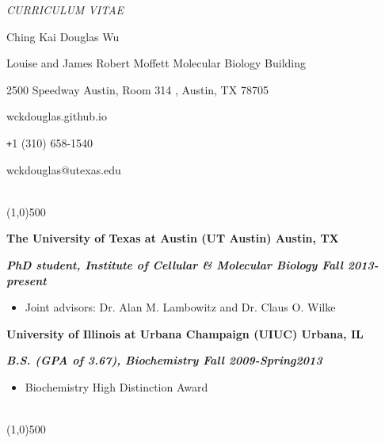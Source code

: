 \documentclass[dvips,11pt]{article}
\begin{document}
\centerline{\it \small CURRICULUM VITAE}
\vspace{2mm}
\centerline{\Large Ching Kai Douglas Wu}  
\centerline{ Louise and James Robert Moffett Molecular Biology Building}
\centerline{2500 Speedway Austin, Room 314 , Austin, TX 78705} 
\centerline{wckdouglas.github.io}
\centerline{\texttt{+}1 (310) 658-1540}
\centerline{wckdouglas@utexas.edu}
\vspace{.5mm}

 \vspace{-2mm}
\\\noindent \line(1,0){500}\\
\noindent \centerline{\bf The University of Texas at Austin (UT Austin) \hfill Austin, TX}
\noindent \centerline{\textit{\textbf{PhD student, Institute of Cellular \& Molecular Biology \hfill Fall 2013-present}}}
\vspace{-6mm}
\begin{spacing}{0.2}
\begin{itemize} \parskip 0pt \parsep 0pt
	\setlength{\itemsep}{0pt}
	\item Joint advisors: Dr. Alan M. Lambowitz and Dr. Claus O. Wilke 
	\end{itemize}
\end{spacing} 

\bigskip
\noindent \centerline{\bf University of Illinois at Urbana Champaign (UIUC) \hfill Urbana, IL}
\noindent \centerline{{\textit{\textbf{B.S. (GPA of 3.67), Biochemistry \hfill Fall 2009-Spring2013}}}}
\vspace{-6mm}
\begin{itemize} \itemsep 1pt \parskip 0pt \parsep 0pt
	\setlength{\itemsep}{0pt}
	\item Biochemistry High Distinction Award
	\end{itemize}
\vspace{-2mm}
\bigskip

 \vspace{-2mm}
\\\noindent
\vspace{-7mm}
\line(1,0){500}\\
\end{document}
